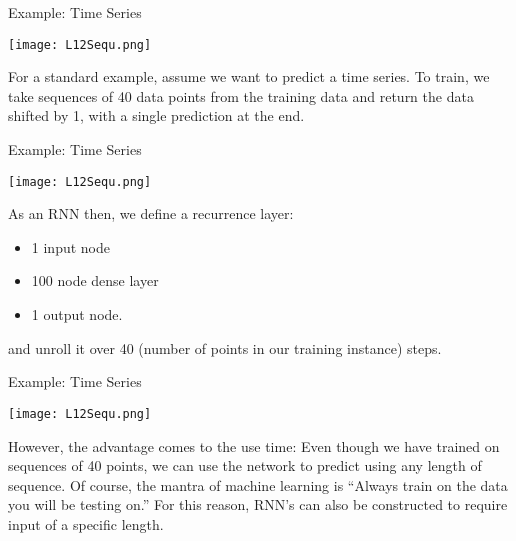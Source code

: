 \documentclass[10pt, table, dvipsnames,xcdraw, handout]{beamer}
\begin{document}
\begin{frame}[fragile]{Example: Time Series}
  \begin{minipage}[t][0.5\textheight][t]{\textwidth}
	\centering \texttt{[image: L12Sequ.png]} 
  \end{minipage}
  \vfill
\begin{minipage}[t][0.5\textheight][t]{\textwidth}
For a standard example, assume we want to predict a time series. To train, we take sequences of 40 data points from the training data and return the data shifted by 1, with a single prediction at the end. 
\end{minipage}
\end{frame}



\begin{frame}[fragile]{Example: Time Series}
  \begin{minipage}[t][0.5\textheight][t]{\textwidth}
	\centering \texttt{[image: L12Sequ.png]} 
  \end{minipage}
  \vfill
\begin{minipage}[t][0.5\textheight][t]{\textwidth}
As an RNN then, we define a recurrence layer:
\begin{itemize}
\item[] 1 input node
\item[] 100 node dense layer
\item[] 1 output node. 
\end{itemize}\pause
and unroll it over 40 (number of points in our training instance) steps.
\end{minipage}
\end{frame}



\begin{frame}[fragile]{Example: Time Series}
  \begin{minipage}[t][0.5\textheight][t]{\textwidth}
	\centering \texttt{[image: L12Sequ.png]} 
  \end{minipage}
  \vfill
\begin{minipage}[t][0.5\textheight][t]{\textwidth}
However, the advantage comes to the use time: Even though we have trained on sequences of 40 points, we can use the network to predict using any length of sequence. Of course, the mantra of machine learning is ``Always train on the data you will be testing on.'' For this reason, RNN's can also be constructed to require input of a specific length. 
\end{minipage}
\end{frame}
\end{document}
